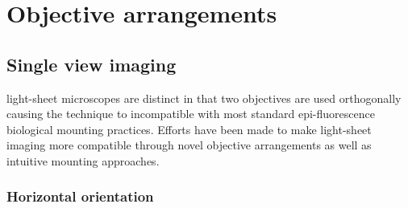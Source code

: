 
\section{Objective arrangements}
\subsection{Single view imaging}
\Gls{light-sheet} microscopes are distinct in that two objectives are used orthogonally causing the technique to incompatible with most standard \gls{epi-fluorescence} biological mounting practices.
Efforts have been made to make \gls{light-sheet} imaging more compatible through novel objective arrangements as well as intuitive mounting approaches.

\subsubsection{Horizontal orientation}


